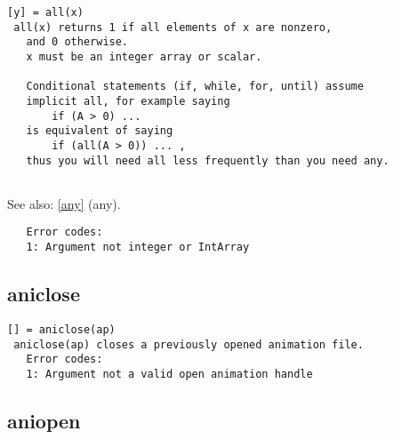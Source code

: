 \documentclass[a4paper]{article}
\begin{document}
\begin{tscreen}
\begin{verbatim}
[y] = all(x)
 all(x) returns 1 if all elements of x are nonzero,
   and 0 otherwise.
   x must be an integer array or scalar.

   Conditional statements (if, while, for, until) assume
   implicit all, for example saying
       if (A > 0) ...
   is equivalent of saying
       if (all(A > 0)) ... ,
   thus you will need all less frequently than you need any.
   
\end{verbatim}

See also: \ref{any} {(any)}.
\begin{verbatim}
   Error codes:
   1: Argument not integer or IntArray 
\end{verbatim}
\end{tscreen}





\subsection{aniclose\label{aniclose}}

\begin{tscreen}
\begin{verbatim}
[] = aniclose(ap)
 aniclose(ap) closes a previously opened animation file.
   Error codes:
   1: Argument not a valid open animation handle
\end{verbatim}
\end{tscreen}





\subsection{aniopen\label{aniopen}}
\end{document}
